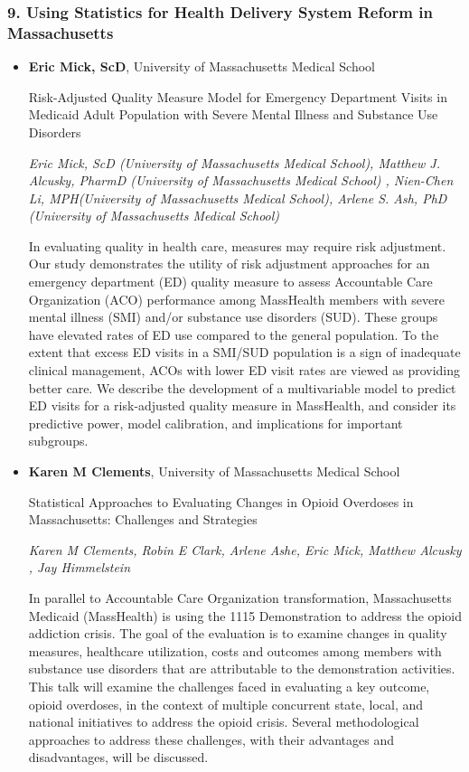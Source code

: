 \subsubsection*{9. Using Statistics for Health Delivery System Reform in Massachusetts}

\begin{itemize}
\item \textbf{Eric Mick, ScD}, University of Massachusetts Medical School

Risk-Adjusted Quality Measure Model for Emergency Department Visits in Medicaid Adult Population with Severe Mental Illness and Substance Use Disorders

\emph{\footnotesize Eric Mick, ScD (University of Massachusetts Medical School), Matthew J. Alcusky, PharmD (University of Massachusetts Medical School) , Nien-Chen Li, MPH(University of Massachusetts Medical School), Arlene S. Ash, PhD (University of Massachusetts Medical School)}

In evaluating quality in health care, measures may require risk adjustment. Our study demonstrates the utility of risk adjustment approaches for an emergency department (ED) quality measure to assess Accountable Care Organization (ACO) performance among MassHealth members with severe mental illness (SMI) and/or substance use disorders (SUD). These groups have elevated rates of ED use compared to the general population. To the extent that excess ED visits in a SMI/SUD population is a sign of inadequate clinical management, ACOs with lower ED visit rates are viewed as providing better care. We describe the development of a multivariable model to predict ED visits for a risk-adjusted quality measure in MassHealth, and consider its predictive power, model calibration, and implications for important subgroups.

\item \textbf{Karen M Clements}, University of Massachusetts Medical School

Statistical Approaches to Evaluating Changes in Opioid Overdoses in Massachusetts: Challenges and Strategies

\emph{\footnotesize Karen M Clements, Robin E Clark, Arlene Ashe, Eric Mick, Matthew Alcusky , Jay Himmelstein}

In parallel to Accountable Care Organization transformation, Massachusetts Medicaid (MassHealth)  is using the 1115 Demonstration to address the opioid addiction crisis.  The goal of the evaluation is to examine changes in quality measures, healthcare utilization, costs and outcomes among members with substance use disorders that are attributable to the demonstration activities.  This talk will  examine the challenges faced in  evaluating a  key outcome, opioid overdoses, in the context of multiple concurrent state, local, and national initiatives to address the opioid crisis.   Several  methodological approaches to  address these challenges, with their advantages and disadvantages, will be discussed.


\end{itemize}
